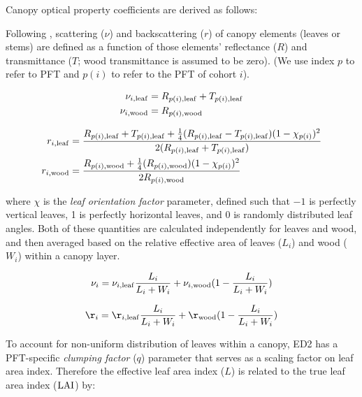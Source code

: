 Canopy optical property coefficients are derived as follows:

Following \citet{clm45_note}, scattering ($\nu$) and backscattering ($r$) of canopy elements (leaves or stems) are defined as a function of those elements' reflectance ($R$) and transmittance ($T$; wood transmittance is assumed to be zero).
(We use index $p$ to refer to PFT and $p(i)$ to refer to the PFT of cohort $i$).

\begin{align}
  \begin{split}
    \nu_{i, \mathrm{leaf}} &= R_{p(i), \mathrm{leaf}} + T_{p(i), \mathrm{leaf}}\\
    \nu_{i, \mathrm{wood}} &= R_{p(i), \mathrm{wood}}\\
  \end{split}
\end{align}

\begin{align}
  \begin{split}
    r_{i, \mathrm{leaf}} &= \frac{R_{p(i), \mathrm{leaf}} + T_{p(i), \mathrm{leaf}} + \frac{1}{4} (R_{p(i), \mathrm{leaf}}-T_{p(i), \mathrm{leaf}})(1 - \chi_{p(i)})^2}{2 (R_{p(i), \mathrm{leaf}}+T_{p(i), \mathrm{leaf}})}\\
    r_{i, \mathrm{wood}} &= \frac{R_{p(i), \mathrm{wood}} + \frac{1}{4} (R_{p(i), \mathrm{wood}})(1 - \chi_{p(i)})^2}{2 R_{p(i), \mathrm{wood}}}
  \end{split}
\end{align}

where $\chi$ is the \emph{leaf orientation factor} parameter, defined such that $-1$ is perfectly vertical leaves, 1 is perfectly horizontal leaves, and 0 is randomly distributed leaf angles.
Both of these quantities are calculated independently for leaves and wood, and then averaged based on the relative effective area of leaves ($L_{i}$) and wood ($W_{i}$) within a canopy layer.

\begin{equation}
  \nu_{i} = \nu_{i, \mathrm{leaf}} \frac{L_{i}}{L_{i} + W_{i}} + \nu_{i, \mathrm{wood}} (1 - \frac{L_{i}}{L_{i} + W_{i}})
\end{equation}

\begin{equation}
  \r_{i} = \r_{i, \leaf} \frac{L_{i}}{L_{i} + W_{i}} + \r_{\wood} (1 - \frac{L_{i}}{L_{i} + W_{i}})
\end{equation}

To account for non-uniform distribution of leaves within a canopy, ED2 has a PFT-specific \emph{clumping factor} ($q$) parameter that serves as a scaling factor on leaf area index.
Therefore the effective leaf area index ($L$) is related to the true leaf area index ($\mathrm{LAI}$) by:

